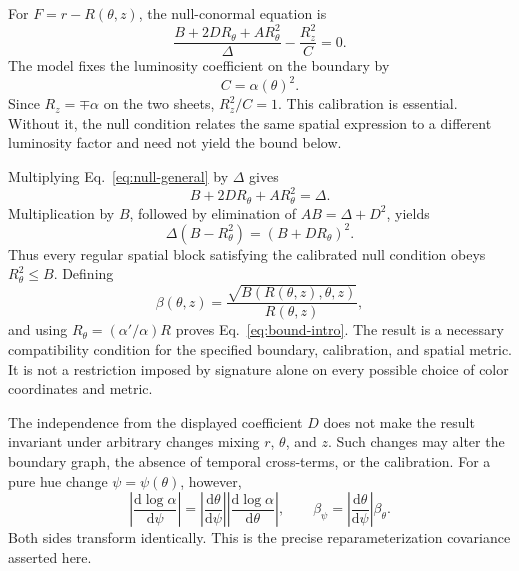 \documentclass[11pt,letterpaper]{article}
\theoremstyle{plain}
\newcommand{\dd}{\mathrm{d}}
\begin{document}
For $F=r-R(\theta,z)$, the null-conormal equation is
\begin{equation}
 \frac{B+2DR_\theta+AR_\theta^2}{\Delta}-\frac{R_z^2}{C}=0.
 \label{eq:null-general}
\end{equation}
The model fixes the luminosity coefficient on the boundary by
\begin{equation}
 C=\alpha(\theta)^2.
 \label{eq:calibration}
\end{equation}
Since $R_z=\mp\alpha$ on the two sheets, $R_z^2/C=1$. This calibration is essential. Without it, the null condition relates the same spatial expression to a different luminosity factor and need not yield the bound below.

Multiplying Eq.~\eqref{eq:null-general} by $\Delta$ gives
\begin{equation}
 B+2DR_\theta+AR_\theta^2=\Delta.
 \label{eq:null-calibrated}
\end{equation}
Multiplication by $B$, followed by elimination of $AB=\Delta+D^2$, yields
\begin{equation}
 \boxed{\Delta(B-R_\theta^2)=(B+DR_\theta)^2.}
 \label{eq:square}
\end{equation}
Thus every regular spatial block satisfying the calibrated null condition obeys $R_\theta^2\leq B$. Defining
\begin{equation}
 \beta(\theta,z)=\frac{\sqrt{B(R(\theta,z),\theta,z)}}{R(\theta,z)},
 \label{eq:beta}
\end{equation}
and using $R_\theta=(\alpha'/\alpha)R$ proves Eq.~\eqref{eq:bound-intro}. The result is a necessary compatibility condition for the specified boundary, calibration, and spatial metric. It is not a restriction imposed by signature alone on every possible choice of color coordinates and metric.

The independence from the displayed coefficient $D$ does not make the result invariant under arbitrary changes mixing $r$, $\theta$, and $z$. Such changes may alter the boundary graph, the absence of temporal cross-terms, or the calibration. For a pure hue change $\psi=\psi(\theta)$, however,
\begin{equation}
 \left|\frac{\dd\log\alpha}{\dd\psi}\right|
 =\left|\frac{\dd\theta}{\dd\psi}\right|
  \left|\frac{\dd\log\alpha}{\dd\theta}\right|,
 \qquad \beta_\psi=\left|\frac{\dd\theta}{\dd\psi}\right|\beta_\theta.
 \label{eq:covariance}
\end{equation}
Both sides transform identically. This is the precise reparameterization covariance asserted here.
\end{document}
